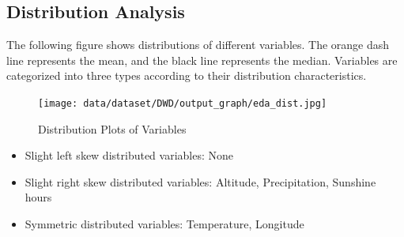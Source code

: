 \documentclass{article}
\begin{document}
\subsection{Distribution Analysis}
The following figure shows distributions of different variables. The orange dash line represents the mean, and the black line represents the median. Variables are categorized into three types according to their distribution characteristics.

\begin{figure}[H]
\centering
\texttt{[image: data/dataset/DWD/output\_graph/eda\_dist.jpg]}
\caption{\label{fig:dist}Distribution Plots of Variables}
\end{figure}

\begin{itemize}
\item Slight left skew distributed variables: None
\item Slight right skew distributed variables: Altitude, Precipitation, Sunshine hours
\item Symmetric distributed variables: Temperature, Longitude
\end{itemize}
\end{document}
